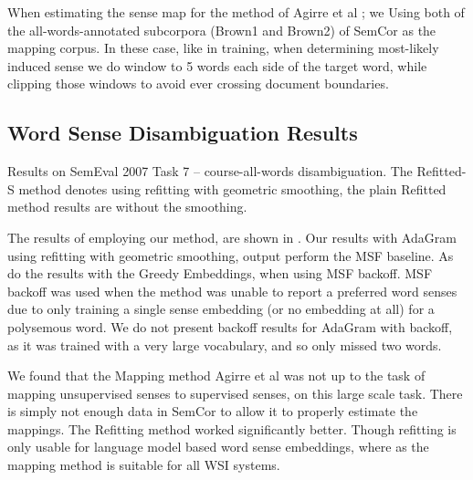 \documentclass{sig-alternate}
\begin{document}
When estimating the sense map for the method of Agirre et al \parencite{agirre2006}; we Using both of the all-words-annotated subcorpora (Brown1 and Brown2) of SemCor as the mapping corpus.
In these case, like in training, when determining most-likely induced sense we do window to 5 words each side of the target word, while clipping those windows to avoid ever crossing document boundaries.

\subsection{Word Sense Disambiguation Results}
\begin{table}
	\begin{adjustbox}{max width=\columnwidth}
	\end{adjustbox}

	\caption{Results on SemEval 2007 Task 7 -- course-all-words disambiguation. The Refitted-S method denotes using refitting with geometric smoothing, the plain Refitted method results are without the smoothing. 
	} \label{samevalres}
\end{table}

The results of employing our method, are shown in . Our results with AdaGram using refitting with geometric smoothing, output perform the MSF baseline. As do the results with the Greedy Embeddings, when using MSF backoff.
MSF backoff was used when the method was unable to report a preferred word senses due to only training a single sense embedding (or no embedding at all) for a polysemous word.
We do not present backoff results for AdaGram with backoff, as it was trained with a very large vocabulary, and so only missed two words.

We found that the Mapping method  Agirre et al \parencite{agirre2006}  was not up to the task of mapping unsupervised senses to supervised senses, on this large scale task. There is simply not enough data in SemCor to allow it to properly estimate the mappings. The Refitting method worked significantly better. Though refitting is only usable for language model based word sense embeddings, where as the mapping method is suitable for all WSI systems.
\end{document}
